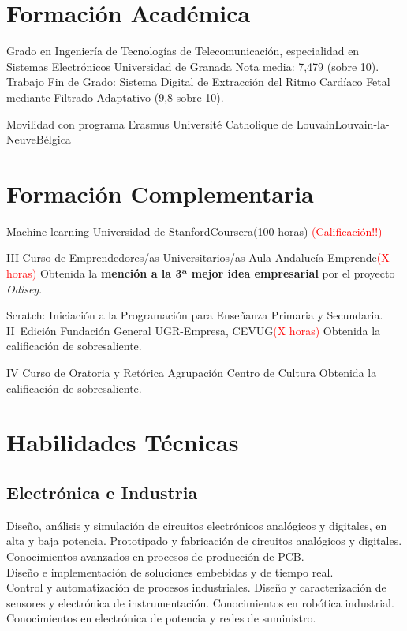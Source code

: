 \documentclass[11pt,a4paper,sans,spanish]{moderncv}
\begin{document}
\section{Formación Académica}

{Grado en Ingeniería de Tecnologías de Telecomunicación, especialidad en Sistemas Electrónicos}
{Universidad de Granada}{}{}
{Nota media: 7,479 (sobre 10). 
Trabajo Fin de Grado: 
Sistema Digital de Extracción del Ritmo Cardíaco Fetal mediante Filtrado Adaptativo (9,8 sobre 10).}

{Movilidad con programa Erasmus}
{Université Catholique de Louvain}{Louvain-la-Neuve}{Bélgica}{}


\section{Formación Complementaria}

{Machine learning}
{Universidad de Stanford}{Coursera}{(100 horas)}
{\textcolor{red}{(Calificación!!)}}

{III Curso de Emprendedores/as Universitarios/as}
{Aula Andalucía Emprende}{}{\textcolor{red}{(X horas)}}
{Obtenida la \textbf{mención a la 3ª mejor idea empresarial} por el proyecto \emph{Odisey}. }

{Scratch: Iniciación a la Programación para Enseñanza Primaria y Secundaria. II~Edición}
{Fundación General UGR-Empresa, CEVUG}{}{\textcolor{red}{(X horas)}}
{Obtenida la calificación de sobresaliente.}

{IV Curso de Oratoria y Retórica}
{Agrupación Centro de Cultura}{}{}
{Obtenida la calificación de sobresaliente.}


\section{Habilidades Técnicas}

\subsection{Electrónica e Industria}
Diseño, análisis y simulación de circuitos electrónicos analógicos y digitales, en alta y baja potencia. 
Prototipado y fabricación de circuitos analógicos y digitales. Conocimientos avanzados en procesos de producción de PCB.
\protect\\[0.3em]
Diseño e implementación de soluciones embebidas y de tiempo real.
\protect\\[0.3em]
Control y automatización de procesos industriales.
Diseño y caracterización de sensores y electrónica de instrumentación. Conocimientos en robótica industrial.
\protect\\[0.3em]
Conocimientos en electrónica de potencia y redes de suministro.
\end{document}
